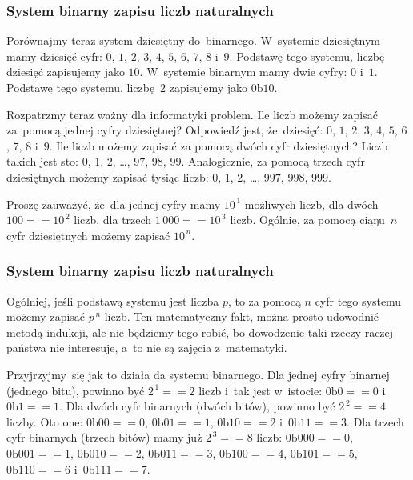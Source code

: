 \documentclass[10pt,t]{beamer}
\newcommand{\btext}{\text{b}}
\begin{document}
\begin{frame}
  \frametitle{System binarny zapisu liczb naturalnych}


  Porównajmy teraz system dziesiętny do~binarnego. W~systemie dziesiętnym
  mamy dziesięć cyfr: $0$, $1$, $2$, $3$, $4$, $5$, $6$, $7$, $8$ i~$9$.
  Podstawę tego systemu, liczbę dziesięć zapisujemy jako $10$. W~systemie
  binarnym mamy dwie cyfry: $0$ i~$1$. Podstawę tego systemu, liczbę~$2$
  zapisujemy jako $0\btext 10$.

  Rozpatrzmy teraz ważny dla informatyki problem. Ile liczb możemy zapisać
  za~pomocą jednej cyfry dziesiętnej? Odpowiedź jest, że~dziesięć:
  $0$, $1$, $2$, $3$, $4$, $5$, $6$, $7$, $8$ i~$9$. Ile liczb możemy
  zapisać za pomocą dwóch cyfr dziesiętnych? Liczb takich jest sto:
  $0$, $1$, $2$, \ldots, $97$, $98$, $99$. Analogicznie, za pomocą trzech cyfr
  dziesiętnych możemy zapisać tysiąc liczb: $0$, $1$, $2$, \ldots, $997$,
  $998$, $999$.

  Proszę zauważyć, że~dla jednej cyfry mamy $10^{ \, 1 }$ możliwych liczb,
  dla dwóch $100 == 10^{ \, 2 }$ liczb, dla trzech $1 \, 000 == 10^{ \, 3 }$
  liczb. Ogólnie, za pomocą ciąŋu~$n$ cyfr dziesiętnych możemy zapisać
  $10^{ \, n }$.

\end{frame}





\begin{frame}
  \frametitle{System binarny zapisu liczb naturalnych}


  Ogólniej, jeśli podstawą systemu jest liczba $p$, to za pomocą
  $n$ cyfr tego systemu możemy zapisać $p^{ \, n }$ liczb. Ten matematyczny
  fakt, można prosto udowodnić metodą indukcji, ale nie będziemy tego
  robić, bo dowodzenie taki rzeczy raczej państwa nie interesuje, a~to nie
  są zajęcia z~matematyki.

  Przyjrzyjmy~się jak to działa da systemu binarnego. Dla jednej cyfry
  binarnej (jednego bitu), powinno być $2^{ \, 1 } == 2$ liczb i~tak
  jest w~istocie: $0\btext 0 == 0$ i~$0\btext 1 == 1$. Dla dwóch cyfr
  binarnych (dwóch bitów), powinno być $2^{ \, 2 } == 4$ liczby.
  Oto one: $0\btext 00 == 0$, $0\btext 01 == 1$, $0\btext 10 == 2$
  i~$0\btext 11 == 3$. Dla trzech cyfr binarnych (trzech bitów) mamy
  już $2^{ \, 3 } == 8$ liczb: $0\btext 000 == 0$, $0\btext 001 == 1$,
  $0\btext 010 == 2$, $0\btext 011 == 3$, $0\btext 100 == 4$,
  $0\btext 101 == 5$, $0\btext 110 == 6$ i~$0\btext 111 == 7$.

\end{frame}
\end{document}
